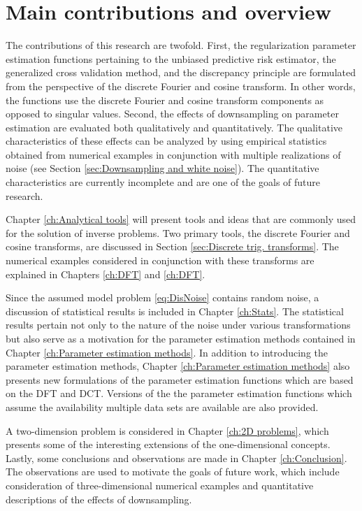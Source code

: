 \section{Main contributions and overview}
The contributions of this research are twofold. First, the regularization parameter estimation functions pertaining to the unbiased predictive risk estimator, the generalized cross validation method, and the discrepancy principle are formulated from the perspective of the discrete Fourier and cosine transform. In other words, the functions use the discrete Fourier and cosine transform components as opposed to singular values. Second, the effects of downsampling on parameter estimation are evaluated both qualitatively and quantitatively. The qualitative characteristics of these effects can be analyzed by using empirical statistics obtained from numerical examples in conjunction with multiple realizations of noise (see Section \ref{sec:Downsampling and white noise}). The quantitative characteristics are currently incomplete and are one of the goals of future research. \par
Chapter \ref{ch:Analytical tools} will present tools and ideas that are commonly used for the solution of inverse problems. Two primary tools, the discrete  Fourier and cosine transforms, are discussed in Section \ref{sec:Discrete trig. transforms}. The numerical examples considered in conjunction with these transforms are explained in Chapters \ref{ch:DFT} and \ref{ch:DFT}. \par 
Since the assumed model problem \eqref{eq:DisNoise} contains random noise, a discussion of statistical results is included in Chapter \ref{ch:Stats}. The statistical results pertain not only to the nature of the noise under various transformations but also serve as a motivation for the parameter estimation methods contained in Chapter \ref{ch:Parameter estimation methods}. In addition to introducing the parameter estimation methods, Chapter \ref{ch:Parameter estimation methods} also presents new formulations of the parameter estimation functions which are based on the DFT and DCT. Versions of the the parameter estimation functions which assume the availability multiple data sets are available are also provided.  \par  
A two-dimension problem is considered in Chapter \ref{ch:2D problems}, which presents some of the interesting extensions of the one-dimensional concepts. Lastly, some conclusions and observations are made in Chapter \ref{ch:Conclusion}. The observations are used to motivate the goals of future work, which include consideration of three-dimensional numerical examples and quantitative descriptions of the effects of downsampling.
